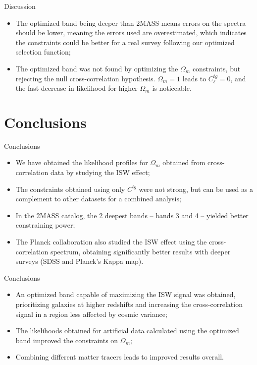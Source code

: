 \documentclass[serif, aspectratio=169]{beamer}
\begin{document}
\begin{frame}{Discussion}
    \begin{itemize}
        \item The optimized band being deeper than 2MASS means errors on the spectra should be lower, meaning the errors used are overestimated, which indicates the constraints could be better for a real survey following our optimized selection function;
        \item The optimized band was not found by optimizing the $\Omega_m$ constraints, but rejecting the null cross-correlation hypothesis. $\Omega_m=1$ leads to $C_\ell^{tg}=0$, and the fast decrease in likelihood for higher $\Omega_m$ is noticeable.
    \end{itemize}
\end{frame}

\section{Conclusions}

\begin{frame}{Conclusions}
    \begin{itemize}
        \item We have obtained the likelihood profiles for $\Omega_m$ obtained from cross-correlation data by studying the ISW effect;
        \item The constraints obtained using only $C^{tg}$ were not strong, but can be used as a complement to other datasets for a combined analysis;
        \item In the 2MASS catalog, the 2 deepest bands -- bands 3 and 4 -- yielded better constraining power;
        \item The Planck collaboration also studied the ISW effect using the cross-correlation spectrum\cite{cross_corr:Planck}, obtaining significantly better results with deeper surveys (SDSS\cite{NVSS} and Planck's Kappa map).
    \end{itemize}
\end{frame}
\begin{frame}{Conclusions}
    \begin{itemize}
        \item An optimized band capable of maximizing the ISW signal was obtained, prioritizing galaxies at higher redshifts and increasing the cross-correlation signal in a region less affected by cosmic variance;
        \item The likelihoods obtained for artificial data calculated using the optimized band improved the constraints on $\Omega_m$;
        \item Combining different matter tracers leads to improved results overall.
    \end{itemize}
\end{frame}
\end{document}
